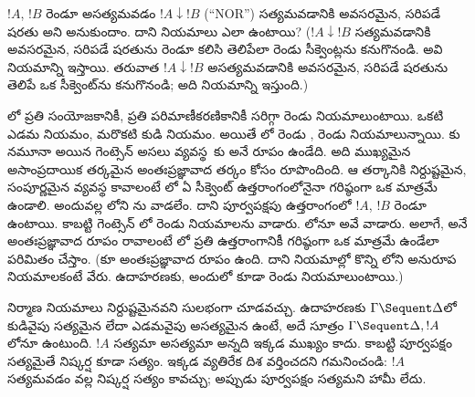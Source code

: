 \documentclass[../../../include/open-logic-section]{subfiles}
\begin{document}
\begin{prob}
$!A$, $!B$ రెండూ అసత్యమవడం $!A \downarrow !B$ (“NOR”) సత్యమవడానికి అవసరమైన, సరిపడే షరతు అని అనుకుందాం. దాని  నియమాలు ఎలా ఉంటాయి? ($!A \downarrow !B$ సత్యమవడానికి అవసరమైన, సరిపడే షరతును రెండూ కలిసి తెలిపేలా రెండు సీక్వెంట్లను కనుగొనండి. అవి \RightR{\downarrow} నియమాన్ని ఇస్తాయి. తరువాత $!A \downarrow !B$ అసత్యమవడానికి అవసరమైన, సరిపడే షరతును తెలిపే ఒక సీక్వెంట్‌ను కనుగొనండి; అది \LeftR{\downarrow} నియమాన్ని ఇస్తుంది.)
\end{prob}

లో ప్రతి సంయోజకానికీ, ప్రతి పరిమాణీకరణికానికీ సరిగ్గా రెండు నియమాలుంటాయి. ఒకటి ఎడమ నియమం, మరొకటి కుడి నియమం. అయితే లో రెండు \LeftR{\land}, రెండు \RightR{\lor} నియమాలున్నాయి. కు నమూనా అయిన గెంట్సెన్ అసలు వ్యవస్థ~కు  అనే రూపం ఉండేది. అది ముఖ్యమైన అసాంప్రదాయిక తర్కమైన అంతఃప్రజ్ఞావాద తర్కం కోసం రూపొందింది. ఆ తర్కానికి నిర్దుష్టమైన, సంపూర్ణమైన వ్యవస్థ కావాలంటే లో ఏ సీక్వెంట్ ఉత్తరాంగంలోనైనా గరిష్ఠంగా ఒక  మాత్రమే ఉండాలి. అందువల్ల లోని \RightR{\lor}ను వాడలేం. దాని పూర్వపక్షపు ఉత్తరాంగంలో $!A$, $!B$ రెండూ ఉంటాయి. కాబట్టి గెంట్సెన్ లో రెండు \RightR{\lor} నియమాలను వాడారు. లోనూ అవే వాడారు. అలాగే,  అనే అంతఃప్రజ్ఞావాద రూపం రావాలంటే లో ప్రతి ఉత్తరాంగానికీ గరిష్ఠంగా ఒక  మాత్రమే ఉండేలా పరిమితం చేస్తాం. (కూ అంతఃప్రజ్ఞావాద రూపం ఉంది. దాని నియమాల్లో కొన్ని లోని అనురూప నియమాలకంటే వేరు. ఉదాహరణకు, అందులో కూడా రెండు \RightR{\lor} నియమాలుంటాయి.)

 నిర్మాణ నియమాలు నిర్దుష్టమైనవని సులభంగా చూడవచ్చు. ఉదాహరణకు $\Gamma \Sequent \Delta$లో కుడివైపు సత్యమైన  లేదా ఎడమవైపు అసత్యమైన  ఉంటే, అదే సూత్రం $\Gamma \Sequent
\Delta, !A$లోనూ ఉంటుంది. $!A$ సత్యమా అసత్యమా అన్నది ఇక్కడ ముఖ్యం కాదు. కాబట్టి \RightR{\Weakening} పూర్వపక్షం సత్యమైతే నిష్కర్ష కూడా సత్యం. ఇక్కడ వ్యతిరేక దిశ వర్తించదని గమనించండి: $!A$ సత్యమవడం వల్ల నిష్కర్ష సత్యం కావచ్చు; అప్పుడు పూర్వపక్షం సత్యమని హామీ లేదు.
\end{document}
